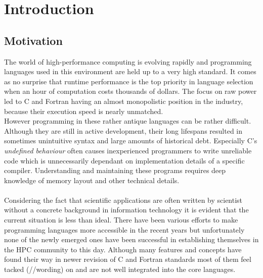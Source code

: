 \chapter{Introduction}
\label{chap:Introduction}


\section{Motivation}
\label{sec:Motivation}

The world of high-performance computing is evolving rapidly and programming languages used in this environment are held up to a very high standard. It comes as no surprise that runtime performance is the top priority in language selection when an hour of computation costs thousands of dollars. The focus on raw power led to C and Fortran having an almost monopolistic position in the industry, because their execution speed is nearly unmatched.
\\
However programming in these rather antique languages can be rather difficult. Although they are still in active development, their long lifespans resulted in sometimes unintuitive syntax and large amounts of historical debt. Especially C's \textit{undefined behaviour} often causes inexperienced programmers to write unreliable code which is unnecessarily dependant on implementation details of a specific compiler. Understanding and maintaining these programs requires deep knowledge of memory layout and other technical details.
\\ \\
Considering the fact that scientific applications are often written by scientist without a concrete background in information technology it is evident that the current situation is less than ideal. There have been various efforts to make programming languages more accessible in the recent years but unfortunately none of the newly emerged ones have been successful in establishing themselves in the HPC community to this day. Although many features and concepts have found their way in newer revision of C and Fortran standards most of them feel tacked (//wording) on and are not well integrated into the core languages.
\\

